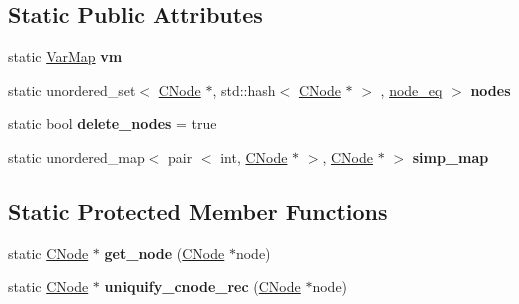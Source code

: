 \subsection*{\-Static \-Public \-Attributes}
\begin{DoxyCompactItemize}
\item 
\hypertarget{classCNode_a2e4ce67a4b7e4e29c86d0228b8828e9f}{static \hyperlink{classVarMap}{\-Var\-Map} {\bfseries vm}}\label{classCNode_a2e4ce67a4b7e4e29c86d0228b8828e9f}

\item 
\hypertarget{classCNode_aa013d9c147078efa7511d4de02ccd7cd}{static unordered\-\_\-set$<$ \hyperlink{classCNode}{\-C\-Node} \*
$\ast$, std\-::hash$<$ \hyperlink{classCNode}{\-C\-Node} $\ast$ $>$\*
, \hyperlink{structnode__eq}{node\-\_\-eq} $>$ {\bfseries nodes}}\label{classCNode_aa013d9c147078efa7511d4de02ccd7cd}

\item 
\hypertarget{classCNode_ae583b3d666a1b849e7dd5e654d8ebcb0}{static bool {\bfseries delete\-\_\-nodes} = true}\label{classCNode_ae583b3d666a1b849e7dd5e654d8ebcb0}

\item 
\hypertarget{classCNode_a12e1e19d4e274fc279e0db7ebf9b1d12}{static unordered\-\_\-map$<$ pair\*
$<$ int, \hyperlink{classCNode}{\-C\-Node} $\ast$ $>$, \hyperlink{classCNode}{\-C\-Node} $\ast$ $>$ {\bfseries simp\-\_\-map}}\label{classCNode_a12e1e19d4e274fc279e0db7ebf9b1d12}

\end{DoxyCompactItemize}
\subsection*{\-Static \-Protected \-Member \-Functions}
\begin{DoxyCompactItemize}
\item 
\hypertarget{classCNode_a16e4c5d20cb9176c9b31e269a7e37c47}{static \hyperlink{classCNode}{\-C\-Node} $\ast$ {\bfseries get\-\_\-node} (\hyperlink{classCNode}{\-C\-Node} $\ast$node)}\label{classCNode_a16e4c5d20cb9176c9b31e269a7e37c47}

\item 
\hypertarget{classCNode_a35b99bd090070bb2b6c9560d78773808}{static \hyperlink{classCNode}{\-C\-Node} $\ast$ {\bfseries uniquify\-\_\-cnode\-\_\-rec} (\hyperlink{classCNode}{\-C\-Node} $\ast$node)}\label{classCNode_a35b99bd090070bb2b6c9560d78773808}

\end{DoxyCompactItemize}
